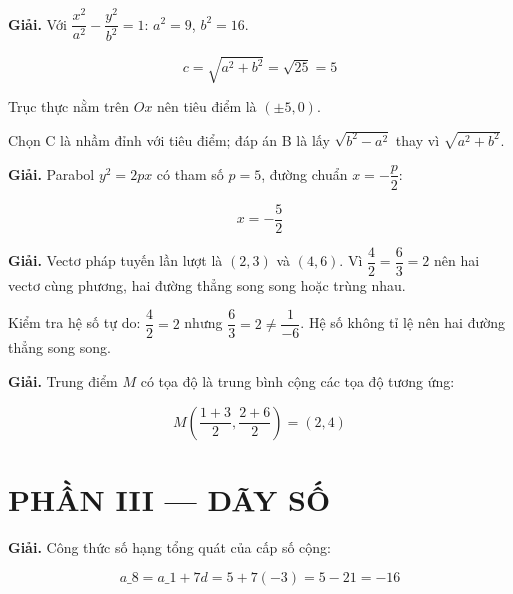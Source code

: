 \documentclass[11pt, a4paper]{article}
\begin{document}
\vspace{0.3cm}
\begin{dapan}[16 — Đáp án D]

\textbf{Giải.} Với $\dfrac{x^2}{a^2} - \dfrac{y^2}{b^2} = 1$: $a^2 = 9$, $b^2 = 16$.

$$c = \sqrt{a^2 + b^2} = \sqrt{25} = 5$$

Trục thực nằm trên $Ox$ nên tiêu điểm là $(\pm 5, 0)$.

 Chọn C là nhầm đỉnh với tiêu điểm; đáp án B là lấy $\sqrt{b^2 - a^2}$ thay vì $\sqrt{a^2 + b^2}$.


\end{dapan}
\vspace{0.3cm}
\begin{dapan}[17 — Đáp án B]

\textbf{Giải.} Parabol $y^2 = 2px$ có tham số $p = 5$, đường chuẩn $x = -\dfrac{p}{2}$:

$$x = -\dfrac{5}{2}$$


\end{dapan}
\vspace{0.3cm}
\begin{dapan}[18 — Đáp án C]

\textbf{Giải.} Vectơ pháp tuyến lần lượt là $(2, 3)$ và $(4, 6)$. Vì $\dfrac{4}{2} = \dfrac{6}{3} = 2$ nên hai vectơ cùng phương, hai đường thẳng song song hoặc trùng nhau.

Kiểm tra hệ số tự do: $\dfrac{4}{2} = 2$ nhưng $\dfrac{6}{3} = 2 \neq \dfrac{1}{-6}$. Hệ số không tỉ lệ nên hai đường thẳng song song.


\end{dapan}
\vspace{0.3cm}
\begin{dapan}[19 — Đáp án A]

\textbf{Giải.} Trung điểm $M$ có tọa độ là trung bình cộng các tọa độ tương ứng:

$$M\left(\dfrac{1+3}{2}, \dfrac{2+6}{2}\right) = (2, 4)$$

\section{PHẦN III — DÃY SỐ}


\end{dapan}
\vspace{0.3cm}
\begin{dapan}[20 — Đáp án D]

\textbf{Giải.} Công thức số hạng tổng quát của cấp số cộng:

$$a\_8 = a\_1 + 7d = 5 + 7(-3) = 5 - 21 = -16$$


\end{dapan}
\end{document}
